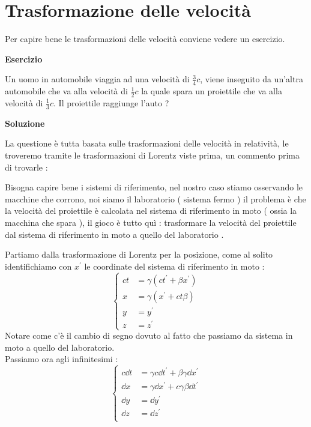 \section{Trasformazione delle velocità}
Per capire bene le trasformazioni delle velocità conviene vedere un esercizio.\\
\begin{center}\textbf{Esercizio  }\end{center} 
Un uomo in automobile viaggia ad una velocità di $\frac{3}{4}c$, viene inseguito da un'altra automobile che va alla velocità di $\frac{1}{2}c$ 
la quale spara un proiettile che va alla velocità di $\frac{1}{3}c$.
Il proiettile raggiunge l'auto ? \\
\begin{center}\textbf{Soluzione}\end{center}
La questione è tutta basata sulle trasformazioni delle velocità in relatività, le troveremo tramite le trasformazioni di Lorentz viste prima, 
un commento prima di trovarle : 
\\
\begin{tcolorbox}[colback=red!5!white,colframe=red!50!black,title=ATTENZIONE !]
Bisogna capire bene i sistemi di riferimento, nel nostro caso stiamo osservando le macchine che corrono, noi siamo il laboratorio ( sistema fermo )
il problema è che la velocità del proiettile è calcolata nel sistema di riferimento in moto ( ossia la macchina che spara ), il gioco è tutto quì : 
trasformare la velocità del proiettile dal sistema di riferimento in moto a quello del laboratorio . 
\end{tcolorbox}
Partiamo dalla trasformazione di Lorentz per la posizione, come al solito identifichiamo con $x^{\prime}$ le coordinate del sistema di riferimento in moto : 
\begin{equation*}
\left\{ \begin{aligned}
                ct&=\gamma(ct^{\prime} + \beta x^{\prime}) \\
        x&= \gamma( x^{\prime} + ct\beta ) \\
        y&= y^{\prime} \\
        z&= z^{\prime}
  \end{aligned}
  \right.
\end{equation*}
Notare come c'è il cambio di segno dovuto al fatto che passiamo da sistema in moto a quello del laboratorio. \\
Passiamo ora agli infinitesimi : 
\begin{equation*}
        \left\{ \begin{aligned}
                        c\dd{t} &= \gamma c\dd{t^{\prime}} + \beta\gamma\dd{x^{\prime}} \\
                        \dd{x} &= \gamma\dd{x^{\prime}} + c\gamma\beta\dd{t^{\prime}} \\
                        \dd{y} &= \dd{y^{\prime}} \\
                        \dd{z} &= \dd{z^{\prime}} \\
                \end{aligned}
                \right.
\end{equation*}
